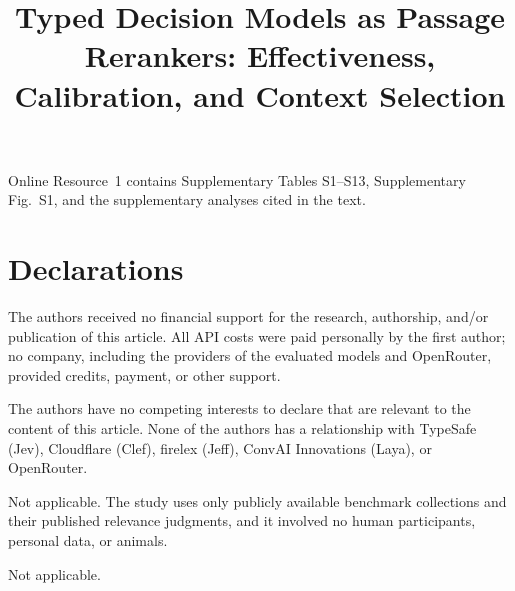 \documentclass[pdflatex,sn-basic,Numbered]{sn-jnl}
\begin{document}
\title[Typed Decision Models as Passage Rerankers]{Typed Decision Models as Passage Rerankers: Effectiveness, Calibration, and Context Selection}


\abstract{}


\maketitle








\backmatter

Online Resource~1 contains Supplementary Tables S1--S13, Supplementary Fig.~S1, and the supplementary analyses cited in the text.

\section*{Declarations}

The authors received no financial support for the research, authorship, and/or publication of this article. All API costs were paid personally by the first author; no company, including the providers of the evaluated models and OpenRouter, provided credits, payment, or other support.

The authors have no competing interests to declare that are relevant to the content of this article. None of the authors has a relationship with TypeSafe (Jev), Cloudflare (Clef), firelex (Jeff), ConvAI Innovations (Laya), or OpenRouter.

Not applicable. The study uses only publicly available benchmark collections and their published relevance judgments, and it involved no human participants, personal data, or animals.

Not applicable.
\end{document}
